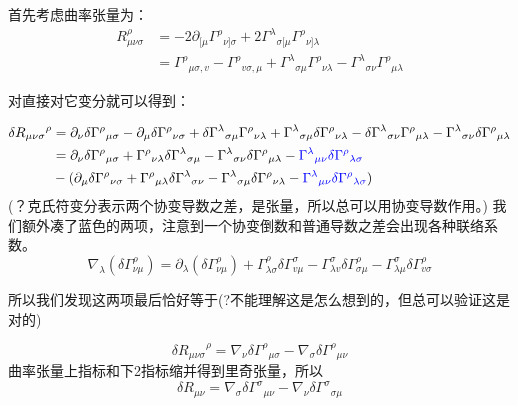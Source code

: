 \documentclass[UTF8]{article}
\newcommand{\blue}[1]{{\color{blue}{#1}}}
\begin{document}
首先考虑曲率张量为：
\begin{equation}
	\begin{aligned}
		R_{\mu \nu \sigma}^{\rho} &=-2 \partial_{[\mu} {\Gamma^{\rho}}_{\nu]\sigma}+2 {\Gamma^{\lambda}}_{\sigma[\mu} {\Gamma^{\rho} }_{\nu] \lambda}\\
		&={\Gamma^\rho}_{\mu \sigma, v}-{\Gamma^\rho}_{v \sigma, \mu}+{\Gamma^\lambda}_{\sigma \mu}{\Gamma^{\rho}}_{\nu \lambda}-{\Gamma^{\lambda}}_{\sigma \nu} {\Gamma^\rho}_{\mu \lambda}
	\end{aligned}
\end{equation}

对直接对它变分就可以得到：

\begin{align}
\delta {R_{\mu\nu\sigma}}^\rho&=
\partial_\nu{\delta\Gamma^\rho}_{\mu \sigma}
-\partial_\mu{\delta\Gamma^\rho}_{\nu \sigma}
+{\delta\Gamma^\lambda}_{\sigma \mu}{\Gamma^{\rho}}_{\nu \lambda}
+{\Gamma^\lambda}_{\sigma \mu}{\delta\Gamma^{\rho}}_{\nu \lambda}
-{\delta\Gamma^{\lambda}}_{\sigma \nu} {\Gamma^\rho}_{\mu \lambda}
-{\Gamma^{\lambda}}_{\sigma \nu} {\delta\Gamma^\rho}_{\mu \lambda}\\
&
=\partial_\nu{\delta\Gamma^\rho}_{\mu \sigma}
+{\Gamma^{\rho}}_{\nu \lambda}{\delta\Gamma^\lambda}_{\sigma \mu}
-{\Gamma^{\lambda}}_{\sigma \nu} {\delta\Gamma^\rho}_{\mu \lambda}
-\blue{{\Gamma^\lambda}_{\mu\nu}\delta{\Gamma^\rho}_{\lambda\sigma}}
\\&
-(\partial_\mu{\delta\Gamma^\rho}_{\nu \sigma}
+{\Gamma^\rho}_{\mu \lambda}{\delta\Gamma^{\lambda}}_{\sigma \nu}
-{\Gamma^\lambda}_{\sigma \mu}{\delta\Gamma^{\rho}}_{\nu \lambda}
-\blue{{\Gamma^\lambda}_{\mu\nu}\delta{\Gamma^\rho}_{\lambda\sigma}}
)
\end{align}
(？克氏符变分表示两个协变导数之差，是张量，所以总可以用协变导数作用。)
我们额外凑了蓝色的两项，注意到一个协变倒数和普通导数之差会出现各种联络系数。
\begin{equation}
	\nabla_{\lambda}\left(\delta \Gamma_{\nu \mu}^{\rho}\right)=\partial_{\lambda}\left(\delta \Gamma_{\nu \mu}^{\rho}\right)+\Gamma_{\lambda \sigma}^{\rho} \delta \Gamma_{v \mu}^{\sigma}-\Gamma_{\lambda v}^{\sigma} \delta \Gamma_{\sigma \mu}^{\rho}-\Gamma_{\lambda \mu}^{\sigma} \delta \Gamma_{v \sigma}^{\rho}
\end{equation}

所以我们发现这两项最后恰好等于(?不能理解这是怎么想到的，但总可以验证这是对的)

\begin{equation}
\delta {R_{\mu\nu\sigma}}^\rho=\nabla_\nu\delta{\Gamma^\rho}_{\mu\sigma}-\nabla_\sigma\delta{\Gamma^\rho}_{\mu\nu}
\end{equation}
曲率张量上指标和下2指标缩并得到里奇张量，所以
\begin{equation}
 \delta{R_{\mu\nu}}=\nabla_\sigma\delta{\Gamma^\sigma}_{\mu\nu}-\nabla_\nu\delta{\Gamma^\sigma}_{\sigma\mu}
\end{equation}
\end{document}
